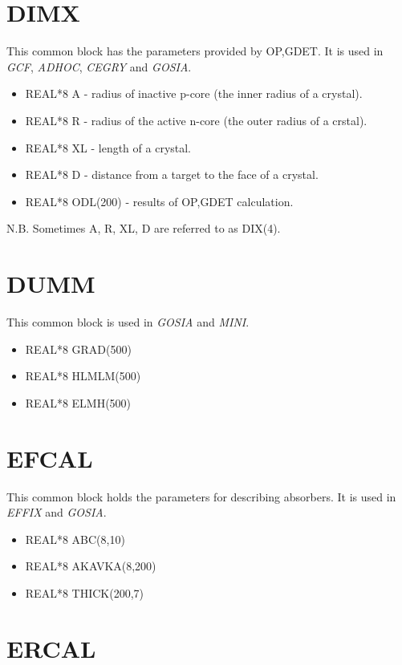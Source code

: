 \section{DIMX}

This common block has the parameters provided by OP,GDET. It is used in {\em
GCF}, {\em ADHOC}, {\em CEGRY} and {\em GOSIA}.

\begin{itemize}
\item REAL*8 A - radius of inactive p-core (the inner radius of a crystal).
\item REAL*8 R - radius of the active n-core (the outer radius of a crstal).
\item REAL*8 XL - length of a crystal.
\item REAL*8 D - distance from a target to the face of a crystal.
\item REAL*8 ODL(200) - results of OP,GDET calculation.
\end{itemize}

N.B. Sometimes A, R, XL, D are referred to as DIX(4).

\section{DUMM}

This common block is used in {\em GOSIA} and {\em MINI}.

\begin{itemize}
\item REAL*8 GRAD(500)
\item REAL*8 HLMLM(500)
\item REAL*8 ELMH(500)
\end{itemize}

\section{EFCAL}

This common block holds the parameters for describing absorbers. It is used
in {\em EFFIX} and {\em GOSIA}.

\begin{itemize}
\item REAL*8 ABC(8,10)
\item REAL*8 AKAVKA(8,200)
\item REAL*8 THICK(200,7)
\end{itemize}

\section{ERCAL}

